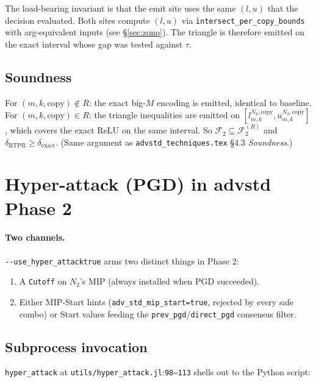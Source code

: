 \documentclass[11pt]{article}
\newcommand{\src}[1]{\texttt{\small #1}}
\newcommand{\flag}[1]{\texttt{-{}-#1}}
\newcommand{\fileline}[2]{\src{#1}:\src{#2}}
\begin{document}
The load-bearing invariant is that the emit site uses the same $(l,
u)$ that the decision evaluated. Both sites compute $(l, u)$ via
\src{intersect\_per\_copy\_bounds} with arg-equivalent inputs (see
\S\ref{sec:zono}). The triangle is therefore emitted on the exact
interval whose gap was tested against $\tau$.

\subsection{Soundness}

For $(m, k, \mathrm{copy}) \notin R$: the exact big-$M$ encoding is
emitted, identical to baseline. For $(m, k, \mathrm{copy}) \in R$:
the triangle inequalities are emitted on
$[l^{N_2,\mathrm{copy}}_{m,k}, u^{N_2,\mathrm{copy}}_{m,k}]$, which
covers the exact ReLU on the same interval. So
$\mathcal F_{2} \subseteq \mathcal F_{2}^{(R)}$ and
$\delta_{\mathrm{BTPR}} \ge \delta_{\mathrm{exact}}$. (Same argument
as \texttt{advstd\_techniques.tex} \S 4.3 \emph{Soundness}.)

\section{Hyper-attack (PGD) in advstd Phase 2}
\label{sec:hyperattack}

\paragraph{Two channels.} \flag{use\_hyper\_attack}\;\texttt{true}
arms two distinct things in Phase 2:

\begin{enumerate}[noitemsep]
  \item A \texttt{Cutoff} on $N_2$'s MIP (always installed when PGD
    succeeded).
  \item Either MIP-Start hints (\texttt{adv\_std\_mip\_start=true},
    rejected by every safe combo) or Start values feeding the
    \texttt{prev\_pgd}/\texttt{direct\_pgd} consensus filter.
\end{enumerate}

\subsection{Subprocess invocation}

\src{hyper\_attack} at \fileline{utils/hyper\_attack.jl}{98--113}
shells out to the Python script:
\end{document}
